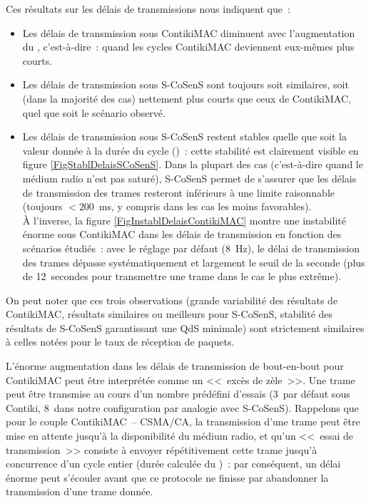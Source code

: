 Ces résultats sur les délais de transmissions nous indiquent que~:

\begin{itemize}

\item Les délais de transmission sous ContikiMAC diminuent avec
l'augmentation du , c'est-à-dire~: quand 
les cycles ContikiMAC deviennent eux-mêmes plus courts.

\item Les délais de transmission sous S-CoSenS sont toujours soit
similaires, soit (dans la majorité des cas) nettement plus courts
que ceux de ContikiMAC, quel que soit le scénario observé.

\item Les délais de transmission sous S-CoSenS restent stables
quelle que soit la valeur donnée à la durée du cycle ()~:
cette stabilité est clairement visible en figure
\vref{FigStablDelaisSCoSenS}. Dans la plupart des cas (c'est-à-dire
quand le médium radio n'est pas saturé), S-CoSenS permet de s'assurer
que les délais de transmission des trames resteront inférieurs à
une limite raisonnable (toujours $< 200$~ms, y compris dans les cas
les moins favorables).\\
À l'inverse, la figure \vref{FigInstablDelaisContikiMAC} montre
une instabilité énorme sous ContikiMAC dans les délais de transmission
en fonction des scénarios étudiés~: avec le réglage par défaut (8~Hz),
le délai de transmission des trames dépasse systématiquement et
largement le seuil de la seconde (plus de 12~secondes pour
transmettre une trame dans le cas le plus extrême).

\end{itemize}

On peut noter que ces trois observations (grande variabilité des résultats
de ContikiMAC, résultats similaires ou meilleurs pour S-CoSenS, stabilité
des résultats de S-CoSenS garantissant une QdS minimale) sont strictement
similaires à celles notées pour le taux de réception de paquets.

\bigskip

L'énorme augmentation dans les délais de transmission de bout-en-bout
pour ContikiMAC peut être interprétée comme un <<~excès de zèle~>>.
Une trame peut être transmise au cours d'un nombre prédéfini d'essais
(3~par défaut sous Contiki, 8~dans notre configuration par analogie
avec S-CoSenS). Rappelons que pour le couple ContikiMAC~-- CSMA/CA,
la transmission d'une trame peut être mise en attente jusqu'à la
disponibilité du médium radio, et qu'un <<~essai de transmission~>>
consiste à envoyer répétitivement cette trame jusqu'à concurrence
d'un cycle entier (durée calculée du )~:
par conséquent, un délai énorme peut s'écouler avant que ce protocole
ne finisse par abandonner la transmission d'une trame donnée.

